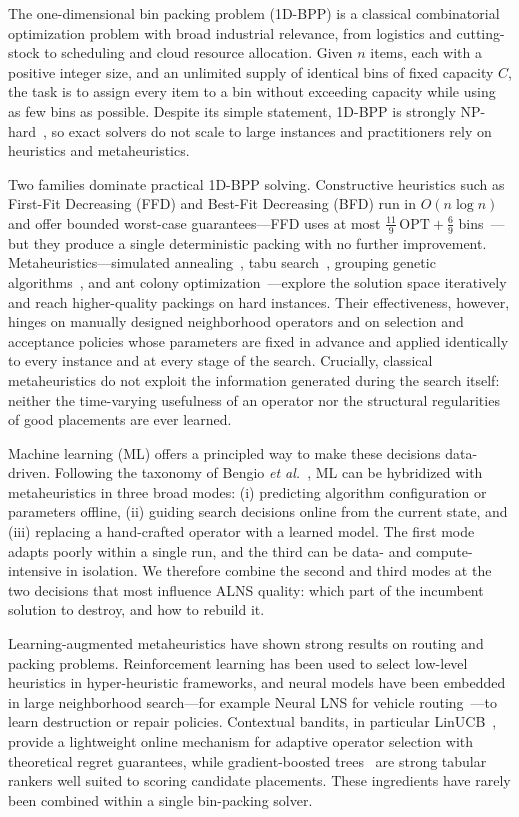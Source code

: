 \documentclass[conference]{IEEEtran}
\begin{document}
The one-dimensional bin packing problem (1D-BPP) is a classical combinatorial
optimization problem with broad industrial relevance, from logistics and
cutting-stock to scheduling and cloud resource allocation. Given $n$ items, each
with a positive integer size, and an unlimited supply of identical bins of fixed
capacity $C$, the task is to assign every item to a bin without exceeding capacity
while using as few bins as possible. Despite its simple statement, 1D-BPP is
strongly NP-hard~\cite{bGarey}, so exact solvers do not scale to large instances
and practitioners rely on heuristics and metaheuristics.

Two families dominate practical 1D-BPP solving. Constructive heuristics such as
First-Fit Decreasing (FFD) and Best-Fit Decreasing (BFD) run in $O(n\log n)$ and
offer bounded worst-case guarantees---FFD uses at most $\tfrac{11}{9}\,\mathrm{OPT}+\tfrac{6}{9}$
bins~\cite{bJohnson}---but they produce a single deterministic packing with no
further improvement. Metaheuristics---simulated annealing~\cite{bKirkpatrick},
tabu search~\cite{bGlover}, grouping genetic algorithms~\cite{bFalkenauer}, and
ant colony optimization~\cite{bDorigo}---explore the solution space iteratively
and reach higher-quality packings on hard instances. Their effectiveness,
however, hinges on manually designed neighborhood operators and on
selection and acceptance policies whose parameters are fixed in advance and
applied identically to every instance and at every stage of the search.
Crucially, classical metaheuristics do not exploit the information generated
during the search itself: neither the time-varying usefulness of an operator nor
the structural regularities of good placements are ever learned.

Machine learning (ML) offers a principled way to make these decisions
data-driven. Following the taxonomy of Bengio \textit{et al.}~\cite{bBengio}, ML
can be hybridized with metaheuristics in three broad modes: (i) predicting
algorithm configuration or parameters offline, (ii) guiding search decisions
online from the current state, and (iii) replacing a hand-crafted operator with a
learned model. The first mode adapts poorly within a single run, and the third
can be data- and compute-intensive in isolation. We therefore combine the second
and third modes at the two decisions that most influence ALNS quality: which part
of the incumbent solution to destroy, and how to rebuild it.

Learning-augmented metaheuristics have shown strong results on routing and
packing problems. Reinforcement learning has been used to select low-level
heuristics in hyper-heuristic frameworks, and neural models have been embedded in
large neighborhood search---for example Neural LNS for vehicle
routing~\cite{bHottung}---to learn destruction or repair policies. Contextual
bandits, in particular LinUCB~\cite{bLi,bChu}, provide a lightweight online
mechanism for adaptive operator selection with theoretical regret guarantees,
while gradient-boosted trees~\cite{bFriedman} are strong tabular rankers
well suited to scoring candidate placements. These ingredients have rarely been
combined within a single bin-packing solver.
\end{document}
